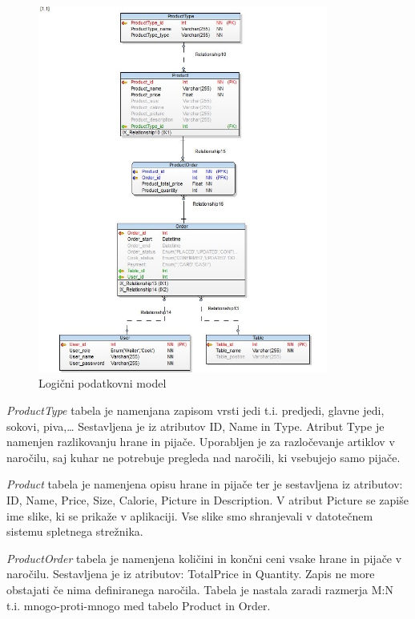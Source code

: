 \documentclass[a4paper, 12pt]{book}
\begin{document}
\begin{figure}[!htb]
\begin{center}
\includegraphics[width=0.85\textwidth]{Database_physical}
\end{center}
\caption{Logični podatkovni model}
\label{Database_physical}
\end{figure}

\textit{ProductType} tabela je namenjana zapisom vrsti jedi t.i. predjedi, glavne jedi, sokovi, piva,… Sestavljena je iz atributov ID, Name in Type. Atribut Type je namenjen razlikovanju hrane in pijače. Uporabljen je za razločevanje artiklov v naročilu, saj kuhar ne potrebuje pregleda nad naročili, ki vsebujejo samo pijače. 

\textit{Product} tabela je namenjena opisu hrane in pijače ter je sestavljena iz atributov: ID, Name, Price, Size, Calorie, Picture in Description.  V atribut Picture se zapiše ime slike, ki se prikaže v aplikaciji. Vse slike smo shranjevali v datotečnem sistemu spletnega strežnika.

\textit{ProductOrder} tabela je namenjena količini in končni ceni vsake hrane in pijače v naročilu. Sestavljena je iz atributov: TotalPrice in Quantity. Zapis ne more obstajati če nima definiranega naročila. Tabela je nastala zaradi razmerja M:N t.i. mnogo-proti-mnogo med tabelo Product in Order.
\end{document}
